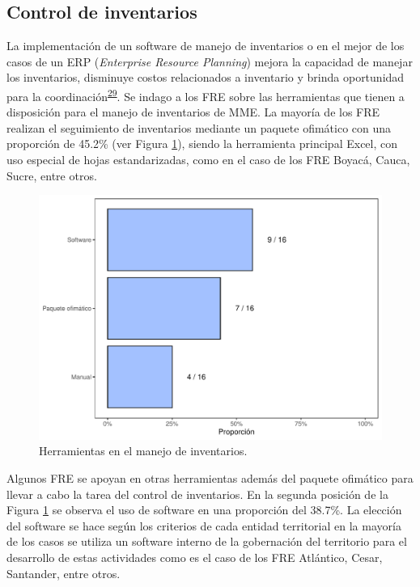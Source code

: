 \documentclass[
]{book}
\begin{document}
\hypertarget{control-de-inventarios}{%
\subsection{Control de inventarios}\label{control-de-inventarios}}

La implementación de un software de manejo de inventarios o en el mejor de los casos de un ERP (\emph{Enterprise Resource Planning}) mejora la capacidad de manejar los inventarios, disminuye costos relacionados a inventario y brinda oportunidad para la coordinación\textsuperscript{\protect\hyperlink{ref-Silver2017}{29}}. Se indago a los FRE sobre las herramientas que tienen a disposición para el manejo de inventarios de MME. La mayoría de los FRE realizan el seguimiento de inventarios mediante un paquete ofimático con una proporción de 45.2\% (ver Figura \ref{fig:HerramientasManejoInventarios}), siendo la herramienta principal Excel, con uso especial de hojas estandarizadas, como en el caso de los FRE Boyacá, Cauca, Sucre, entre otros.

\begin{figure}[t]

{\centering \includegraphics[width=0.95\linewidth]{InformeFinal_files/figure-latex/HerramientasManejoInventarios-1} 

}

\caption{Herramientas en el manejo de inventarios.}\label{fig:HerramientasManejoInventarios}
\end{figure}

Algunos FRE se apoyan en otras herramientas además del paquete ofimático para llevar a cabo la tarea del control de inventarios. En la segunda posición de la Figura \ref{fig:HerramientasManejoInventarios} se observa el uso de software en una proporción del 38.7\%. La elección del software se hace según los criterios de cada entidad territorial en la mayoría de los casos se utiliza un software interno de la gobernación del territorio para el desarrollo de estas actividades como es el caso de los FRE Atlántico, Cesar, Santander, entre otros.
\end{document}
